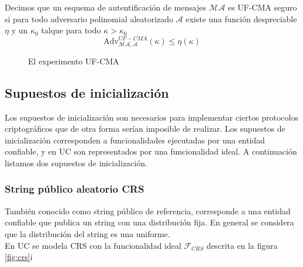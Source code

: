 \begin{definicion}
Decimos que un esquema de autentificación de mensajes $\mathcal{MA}$ es UF-CMA seguro si para todo
adversario polinomial aleatorizado $\mathcal{A}$ existe una función despreciable $\eta$ y un $\kappa_0$
talque para todo $\kappa > \kappa_0$
$$\mathrm{Adv}^{UF-CMA}_{\mathcal{MA}, \mathcal{A}}(\kappa) \leq \eta(\kappa)$$
\end{definicion}

\begin{figure}
\caption{El experimento UF-CMA}
\label{fig:uf-cma}
\end{figure}

\subsection{Supuestos de inicialización}
Los supuestos de inicialización son necesarios para implementar ciertos protocolos criptográficos
que de otra forma serían imposible de realizar. Los supuestos de inicialización corresponden a funcionalidades
ejecutadas por una entidad confiable, y en UC son representados por una funcionalidad ideal. A continuación
listamos dos supuestos de inicialización.


\subsubsection{String público aleatorio CRS}
También conocido como string público de referencia, corresponde a una entidad confiable que publica un string
con una distribución fija. En general se considera que la distribución del string es una uniforme.\\
En UC se modela CRS con la funcionalidad ideal $\mathcal{F}_{CRS}$ descrita en la figura \ref{fig:crs}i

